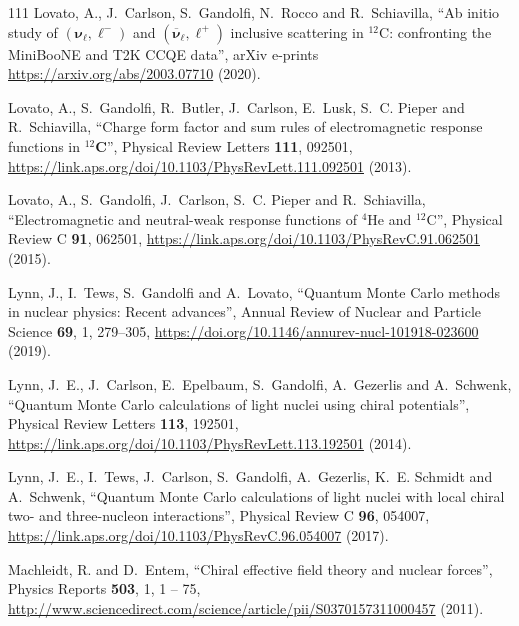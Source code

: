 \documentclass[12pt,letterpaper,UTF8]{report}
\begin{document}
{\begin{thebibliography}{111}
{Lovato}, A., J.~{Carlson}, S.~{Gandolfi}, N.~{Rocco} and R.~{Schiavilla},
  \enquote{{Ab initio study of $\boldsymbol{(\nu_\ell,\ell^-)}$ and
  $\boldsymbol{(\overline{\nu}_\ell,\ell^+)}$ inclusive scattering in $^{12}$C:
  confronting the MiniBooNE and T2K CCQE data}}, arXiv e-prints
  \urlprefix\url{https://arxiv.org/abs/2003.07710} (2020).

Lovato, A., S.~Gandolfi, R.~Butler, J.~Carlson, E.~Lusk, S.~C. Pieper and
  R.~Schiavilla, \enquote{Charge form factor and sum rules of electromagnetic
  response functions in $^{12}\mathbf{C}$}, Physical Review Letters
  \textbf{111}, 092501,
  \urlprefix\url{https://link.aps.org/doi/10.1103/PhysRevLett.111.092501}
  (2013).

Lovato, A., S.~Gandolfi, J.~Carlson, S.~C. Pieper and R.~Schiavilla,
  \enquote{Electromagnetic and neutral-weak response functions of
  $^{4}\mathrm{He}$ and $^{12}\mathrm{C}$}, Physical Review C \textbf{91},
  062501, \urlprefix\url{https://link.aps.org/doi/10.1103/PhysRevC.91.062501}
  (2015).

Lynn, J., I.~Tews, S.~Gandolfi and A.~Lovato, \enquote{Quantum {Monte} {Carlo}
  methods in nuclear physics: Recent advances}, Annual Review of Nuclear and
  Particle Science \textbf{69}, 1, 279--305,
  \urlprefix\url{https://doi.org/10.1146/annurev-nucl-101918-023600} (2019).

Lynn, J.~E., J.~Carlson, E.~Epelbaum, S.~Gandolfi, A.~Gezerlis and A.~Schwenk,
  \enquote{Quantum {Monte} {Carlo} calculations of light nuclei using chiral
  potentials}, Physical Review Letters \textbf{113}, 192501,
  \urlprefix\url{https://link.aps.org/doi/10.1103/PhysRevLett.113.192501}
  (2014).

Lynn, J.~E., I.~Tews, J.~Carlson, S.~Gandolfi, A.~Gezerlis, K.~E. Schmidt and
  A.~Schwenk, \enquote{Quantum {Monte} {Carlo} calculations of light nuclei
  with local chiral two- and three-nucleon interactions}, Physical Review C
  \textbf{96}, 054007,
  \urlprefix\url{https://link.aps.org/doi/10.1103/PhysRevC.96.054007} (2017).

Machleidt, R. and D.~Entem, \enquote{Chiral effective field theory and nuclear
  forces}, Physics Reports \textbf{503}, 1, 1 -- 75,
  \urlprefix\url{http://www.sciencedirect.com/science/article/pii/S0370157311000457}
  (2011).


\end{thebibliography}}
\end{document}
